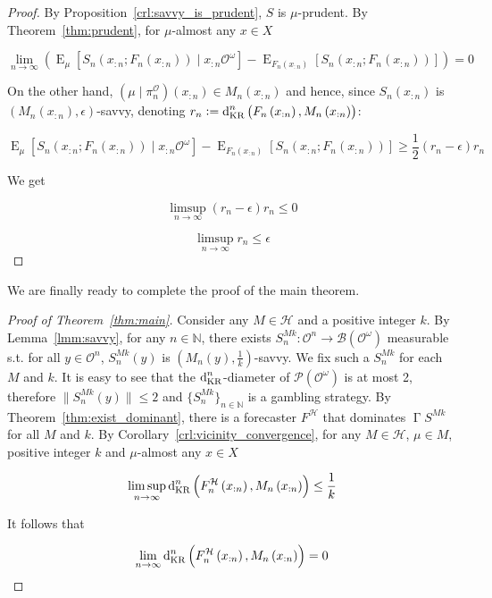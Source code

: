 \documentclass[aop,preprint]{imsart}
\numberwithin{equation}{section}
\theoremstyle{definition}
\theoremstyle{plain}
\newcommand{\Nats}{\mathbb{N}}
\newcommand{\N}[1]{\lVert #1 \rVert}
\newcommand{\Sq}[2]{\{#1\}_{#2 \in \Nats}}
\newcommand{\Sqn}[1]{\Sq{#1}{n}}
\DeclareMathOperator{\E}{E}
\newcommand{\PM}{\mathcal{P}}
\newcommand{\DKR}{\operatorname{d}_{\textnormal{KR}}}
\newcommand{\Ob}{\mathcal{O}}
\newcommand{\OO}{\Ob^\omega}
\newcommand{\PO}{\pi^\Ob}
\newcommand{\PMO}{\PM(\OO)}
\newcommand{\MC}{\mathcal{H}}
\newcommand{\Gm}{\mathcal{B}}
\newcommand{\GMO}{\Gm(\OO)}
\DeclareMathOperator{\PG}{\Gamma}
\begin{document}
\begin{proof}

By Proposition~\ref{crl:savvy_is_prudent}, $S$ is $\mu$-prudent. By Theorem~\ref{thm:prudent}, for $\mu$-almost any $x \in X$

$$\lim_{n \rightarrow \infty} {\left(\E_{\mu}\left[S_n\left(x_{:n};F_n\left(x_{:n}\right)\right) \mid x_{:n}\OO\right]-\E_{F_n\left(x_{:n}\right)}\left[S_n\left(x_{:n};F_n\left(x_{:n}\right)\right)\right]\right)} = 0$$

On the other hand, $\left(\mu \mid \PO_n\right)\left(x_{:n}\right) \in M_n\left(x_{:n}\right)$ and hence, since $S_n\left(x_{:n}\right)$ is $\left(M_n\left(x_{:n}\right),\epsilon\right)$-savvy, denoting $r_n:=\DKR^n\left(F_n\left(x_{:n}\right), M_n\left(x_{:n}\right)\right)$: 

$$\E_{\mu}\left[S_n\left(x_{:n};F_n\left(x_{:n}\right)\right) \mid x_{:n}\OO\right]-\E_{F_n\left(x_{:n}\right)}\left[S_n\left(x_{:n};F_n\left(x_{:n}\right)\right)\right] \geq \frac{1}{2} \left(r_{n} - \epsilon\right) r_n$$

We get

$$\limsup_{n \rightarrow \infty} {\left(r_{n} - \epsilon\right) r_n} \leq 0$$

$$\limsup_{n \rightarrow \infty} {r_n} \leq \epsilon$$
\end{proof}

We are finally ready to complete the proof of the main theorem.

\begin{proof}[Proof of Theorem~\ref{thm:main}]

Consider any $M \in \MC$ and a positive integer $k$. By Lemma~\ref{lmm:savvy}, for any $n \in \Nats$, there exists ${S^{Mk}_{n}: \Ob^n \rightarrow \GMO}$ measurable s.t. for all $y \in \Ob^n$, $S^{Mk}_{n}\left(y\right)$ is $\left(M_n(y),\frac{1}{k}\right)$-savvy. We fix such a $S^{Mk}_{n}$ for each $M$ and $k$. It is easy to see that the $\DKR^n$-diameter of $\PMO$ is at most 2, therefore $\N{S^{Mk}_{n}\left(y\right)} \leq 2$ and $\Sqn{S^{Mk}_{n}}$ is a gambling strategy. By Theorem~\ref{thm:exist_dominant}, there is a forecaster $F^\MC$ that dominates $\PG{S}^{Mk}$ for all $M$ and $k$. By Corollary~\ref{crl:vicinity_convergence}, for any $M \in \MC$, $\mu \in M$, positive integer $k$ and $\mu$-almost any $x \in X$

$$\limsup_{n \rightarrow \infty} {\DKR^n\left(F^\MC_n\left(x_{:n}\right),M_n\left(x_{:n}\right)\right)} \leq \frac{1}{k}$$

It follows that

$$\lim_{n \rightarrow \infty} {\DKR^n\left(F^\MC_n\left(x_{:n}\right),M_n\left(x_{:n}\right)\right)} = 0$$
\end{proof}
\end{document}
